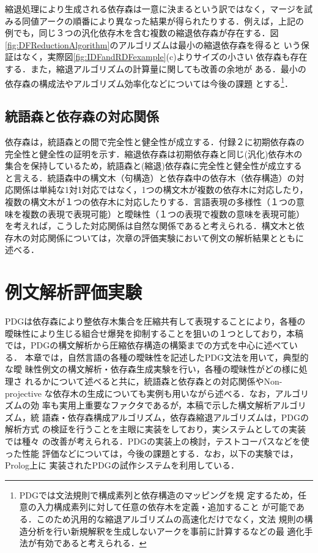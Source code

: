 縮退処理により生成される依存森は一意に決まるという訳ではなく，マージを試
みる同値アークの順番により異なった結果が得られたりする．例えば，上記の
例でも，同じ３つの汎化依存木を含む複数の縮退依存森が存在する．図
\ref{fig:DFReductionAlgorithm}のアルゴリズムは最小の縮退依存森を得ると
いう保証はなく，実際図\ref{fig:IDFandRDFexample}(c)よりサイズの小さい
依存森も存在する．また，縮退アルゴリズムの計算量に関しても改善の余地が
ある．最小の依存森の構成法やアルゴリズム効率化などについては今後の課題
とする\footnote{PDGでは文法規則で構成素列と依存構造のマッピングを規
定するため，任意の入力構成素列に対して任意の依存木を定義・追加すること
が可能である．このため汎用的な縮退アルゴリズムの高速化だけでなく，文法
規則の構造分析を行い新規解釈を生成しないアークを事前に計算するなどの最
適化手法が有効であると考えられる．}．

\subsection{統語森と依存森の対応関係}\label{sec:MappingBetweenPTAndDT}
依存森は，統語森との間で完全性と健全性が成立する．付録２に初期依存森の
完全性と健全性の証明を示す．縮退依存森は初期依存森と同じ(汎化)依存木の
集合を保持しているため，統語森と(縮退)依存森に完全性と健全性が成立する
と言える．統語森中の構文木（句構造）と依存森中の依存木（依存構造）の対
応関係は単純な1対1対応ではなく，1つの構文木が複数の依存木に対応したり，
複数の構文木が１つの依存木に対応したりする．言語表現の多様性（１つの意
味を複数の表現で表現可能）と曖昧性（１つの表現で複数の意味を表現可能）
を考えれば，こうした対応関係は自然な関係であると考えられる．構文木と依
存木の対応関係については，次章の評価実験において例文の解析結果とともに
述べる．

\section{例文解析評価実験}

PDGは依存森により整依存木集合を圧縮共有して表現することにより，各種の
曖昧性により生じる組合せ爆発を抑制することを狙いの１つとしており，本稿
では，PDGの構文解析から圧縮依存構造の構築までの方式を中心に述べている．
本章では，自然言語の各種の曖昧性を記述したPDG文法を用いて，典型的な曖
昧性例文の構文解析・依存森生成実験を行い，各種の曖昧性がどの様に処理さ
れるかについて述べると共に，統語森と依存森との対応関係やNon-projective 
な依存木の生成についても実例も用いながら述べる．なお，アルゴリズムの効
率も実用上重要なファクタであるが，本稿で示した構文解析アルゴリズム，統
語森・依存森構成アルゴリズム，依存森縮退アルゴリズムは，PDGの解析方式
の検証を行うことを主眼に実装をしており，実システムとしての実装では種々
の改善が考えられる．PDGの実装上の検討，テストコーパスなどを使った性能
評価などについては，今後の課題とする．なお，以下の実験では，Prolog上に
実装されたPDGの試作システムを利用している．

